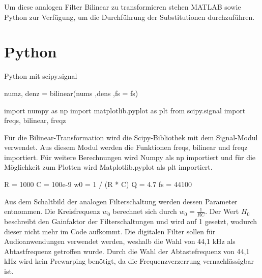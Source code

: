 \documentclass[
  ngerman,
  letterpaper,
  DIV=11]{scrreprt}
\newenvironment{Shaded}{\begin{snugshade}}{\end{snugshade}}
\newcommand{\DecValTok}[1]{\textcolor[rgb]{0.68,0.00,0.00}{#1}}
\newcommand{\FloatTok}[1]{\textcolor[rgb]{0.68,0.00,0.00}{#1}}
\newcommand{\ImportTok}[1]{\textcolor[rgb]{0.00,0.46,0.62}{#1}}
\newcommand{\NormalTok}[1]{\textcolor[rgb]{0.00,0.23,0.31}{#1}}
\newcommand{\OperatorTok}[1]{\textcolor[rgb]{0.37,0.37,0.37}{#1}}
\begin{document}
Um diese analogen Filter Bilinear zu transformieren stehen MATLAB sowie
Python zur Verfügung, um die Durchführung der Substitutionen
durchzuführen.

\section{Python}\label{python}

Python mit scipy.signal

\begin{Shaded}
\begin{Highlighting}[]
\NormalTok{numz, denz }\OperatorTok{=}\NormalTok{ bilinear(nums ,dens ,fs }\OperatorTok{=}\NormalTok{ fs)}
\end{Highlighting}
\end{Shaded}

\begin{Shaded}
\begin{Highlighting}[]
\ImportTok{import}\NormalTok{ numpy }\ImportTok{as}\NormalTok{ np}
\ImportTok{import}\NormalTok{ matplotlib.pyplot }\ImportTok{as}\NormalTok{ plt}
\ImportTok{from}\NormalTok{ scipy.signal }\ImportTok{import}\NormalTok{ freqs, bilinear, freqz}
\end{Highlighting}
\end{Shaded}

Für die Bilinear-Transformation wird die Scipy-Bibliothek mit dem
Signal-Modul verwendet. Aus diesem Modul werden die Funktionen freqs,
bilinear und freqz importiert. Für weitere Berechnungen wird Numpy als
np importiert und für die Möglichkeit zum Plotten wird Matplotlib.pyplot
als plt importiert.

\begin{Shaded}
\begin{Highlighting}[]
\NormalTok{R }\OperatorTok{=} \DecValTok{1000}
\NormalTok{C }\OperatorTok{=} \FloatTok{100e{-}9}
\NormalTok{w0 }\OperatorTok{=} \DecValTok{1} \OperatorTok{/}\NormalTok{ (R }\OperatorTok{*}\NormalTok{ C)}
\NormalTok{Q }\OperatorTok{=} \FloatTok{4.7}
\NormalTok{fs }\OperatorTok{=} \DecValTok{44100}
\end{Highlighting}
\end{Shaded}

Aus dem Schaltbild der analogen Filterschaltung werden dessen Parameter
entnommen. Die Kreisfrequenz \(w_0\) berechnet sich durch
\(w_0 = \frac{1}{R C}\). Der Wert \(H_0\) beschreibt den Gainfaktor der
Filterschaltungen und wird auf 1 gesetzt, wodurch dieser nicht mehr im
Code aufkommt. Die digitalen Filter sollen für Audioanwendungen
verwendet werden, weshalb die Wahl von 44,1 kHz als Abtastfrequenz
getroffen wurde. Durch die Wahl der Abtastefrequenz von 44,1 kHz wird
kein Prewarping benötigt, da die Frequenzverzerrung vernachlässigbar
ist.
\end{document}
